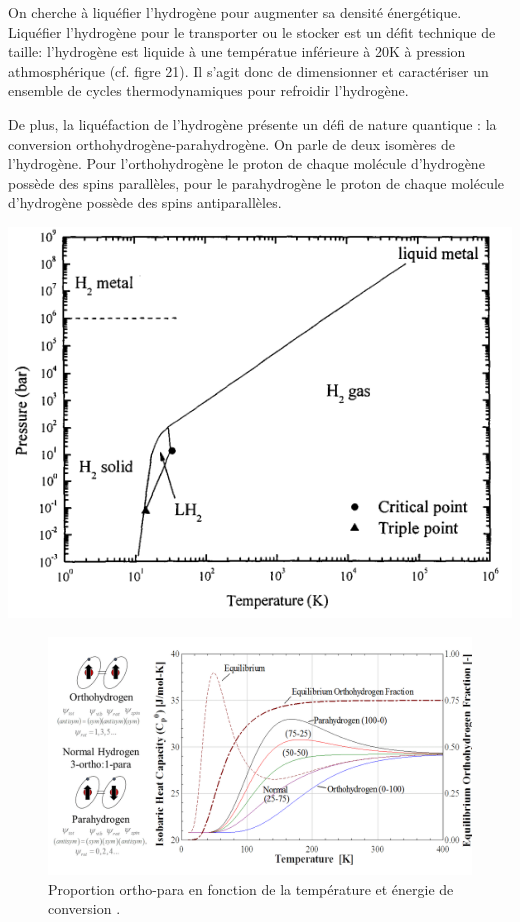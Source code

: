 \documentclass[11pt,french,a4paper]{article}
\begin{document}
\begin{multicols}{2}
On cherche à liquéfier l'hydrogène pour augmenter sa densité énergétique. Liquéfier l'hydrogène pour le transporter ou le stocker est un défit technique de taille: l'hydrogène est liquide à une températue inférieure à 20K à pression athmosphérique (cf. figre 21). Il s'agit donc de dimensionner et caractériser un ensemble de cycles thermodynamiques pour refroidir l'hydrogène. 

De plus, la liquéfaction de l'hydrogène présente un défi de nature quantique : la conversion orthohydrogène-parahydrogène. On parle de deux isomères de l'hydrogène. Pour l'orthohydrogène le proton de chaque molécule d'hydrogène possède des spins parallèles, pour le parahydrogène le proton de chaque molécule d'hydrogène possède des spins antiparallèles.


\begin{center}
  \includegraphics[width=\linewidth]{image/chap3/diagramme de phase H2.png}
\end{center}

\end{multicols}

\begin{figure}[!h]
  \centering
  \includegraphics[width=0.6\linewidth]{image/chap3/Ortho-para.png}
 \caption{Proportion ortho-para en fonction de la température et énergie de conversion \cite{orthopara}.}
\end{figure}
\end{document}
